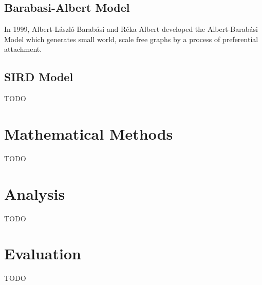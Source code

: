\documentclass{article}
\begin{document}
        \subsection{Barabasi-Albert Model}
        In 1999, Albert-László Barabási and Réka Albert developed the Albert-Barabási Model which generates small world, scale free graphs by a process of preferential attachment. 
        \subsection{SIRD Model}
        TODO
    \section{Mathematical Methods}
    TODO
    \section{Analysis}
    TODO
    \section{Evaluation}
    TODO
    
    
    
    
\printbibliography
\end{document}
